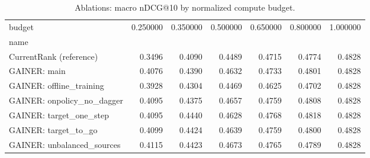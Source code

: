 \begin{table}
\caption{Ablations: macro nDCG@10 by normalized compute budget.}
\label{tab:ablations}
\begin{tabular}{lrrrrrr}
\toprule
budget & 0.250000 & 0.350000 & 0.500000 & 0.650000 & 0.800000 & 1.000000 \\
name &  &  &  &  &  &  \\
\midrule
CurrentRank (reference) & 0.3496 & 0.4090 & 0.4489 & 0.4715 & 0.4774 & 0.4828 \\
GAINER: main & 0.4076 & 0.4390 & 0.4632 & 0.4733 & 0.4801 & 0.4828 \\
GAINER: offline_training & 0.3928 & 0.4304 & 0.4469 & 0.4625 & 0.4702 & 0.4828 \\
GAINER: onpolicy_no_dagger & 0.4095 & 0.4375 & 0.4657 & 0.4759 & 0.4808 & 0.4828 \\
GAINER: target_one_step & 0.4095 & 0.4440 & 0.4628 & 0.4768 & 0.4818 & 0.4828 \\
GAINER: target_to_go & 0.4099 & 0.4424 & 0.4639 & 0.4759 & 0.4800 & 0.4828 \\
GAINER: unbalanced_sources & 0.4115 & 0.4423 & 0.4673 & 0.4765 & 0.4789 & 0.4828 \\
\bottomrule
\end{tabular}
\end{table}
